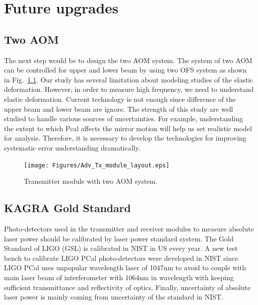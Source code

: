 
\chapter{Future upgrades} %

\label{Chapter7} %
\section{Two AOM}
The next step would be to design the two AOM system. The system of two AOM can be controlled for upper and lower beam by using two OFS system as shown in Fig.~\ref{fig:Adv_Tx_module_layout}. Our study has several limitation about modeling studies of the elastic deformation. However, in order to measure high frequency, we need to understand elastic deformation.
Current technology is not enough since difference of the upper beam and lower beam are ignore. The strength of this study are well studied to handle various sources of uncertainties. For example, understanding the extent to which Pcal affects the mirror motion will help us set realistic model for analysis. Therefore, it is necessary to develop the technologies for improving systematic error understanding dramatically.
\begin{figure}
\begin{center}
\texttt{[image: Figures/Adv\_Tx\_module\_layout.eps]}
\caption{Transmitter module with two AOM system.} 
\label{fig:Adv_Tx_module_layout} 
\end{center}
\end{figure}

\section{KAGRA Gold Standard}
Photo-detectors used in the transmitter and receiver modules to measure absolute laser power should be calibrated by laser power standard system. The Gold Standard of LIGO (GSL) is calibrated in NIST in US every year. A new test bench to calibrate LIGO PCal photo-detectors were developed in NIST since LIGO PCal uses unpopular wavelength laser of 1047nm to avoid to couple with main laser beam of interferometer with 1064nm in wavelength with keeping sufficient transmittance and reflectivity of optics. Finally, uncertainty of absolute laser power is mainly coming from uncertainty of the standard in NIST. 

